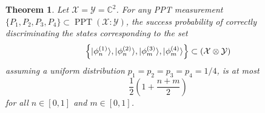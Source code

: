 \documentclass[11pt]{article}
\newtheorem{theorem}{Theorem}
\theoremstyle{definition}
\newcommand{\microspace}{\mspace{0.5mu}}
\newcommand{\PPT}{\operatorname{PPT}}
\newcommand{\ket}[1]{
  \lvert\microspace #1 \microspace \rangle}
\newcommand{\complex}{\mathbb{C}}
\newcommand{\X}{\mathcal{X}}
\newcommand{\Y}{\mathcal{Y}}
\begin{document}
\begin{theorem}\label{thm:min_error_four_state_two_qubit_ppt}
    Let $\X = \Y = \complex^2$. For any PPT measurement $\{ P_1, P_2, P_3, P_4
    \} \subset \PPT(\X : \Y)$, the success probability of correctly
    discriminating the states corresponding to the set 
	\begin{equation}
        \left\{ 
            \ket{\phi_n^{(1)}},
            \ket{\phi_n^{(2)}},
            \ket{\phi_m^{(3)}},
            \ket{\phi_m^{(4)}} 
        \right\} \subset 
        \left(\X \otimes \Y \right)
	\end{equation}
    assuming a uniform distribution $p_1 = p_2 = p_3 = p_4 = 1/4$, is at most
    \begin{equation}
        \frac{1}{2} \left(1 + \frac{n+m}{2}\right)
    \end{equation}
    for all $n \in [0, 1]$ and $m \in [0, 1]$.
\end{theorem}
\end{document}
